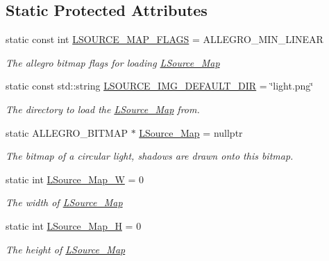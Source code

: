 \subsection*{Static Protected Attributes}
\begin{DoxyCompactItemize}
\item 
static const int \hyperlink{classlighting_1_1LightSource_a596474efbeedef2777aeb01e33d845f5}{L\+S\+O\+U\+R\+C\+E\+\_\+\+M\+A\+P\+\_\+\+F\+L\+A\+GS} = A\+L\+L\+E\+G\+R\+O\+\_\+\+M\+I\+N\+\_\+\+L\+I\+N\+E\+AR
\begin{DoxyCompactList}\small\item\em The allegro bitmap flags for loading \hyperlink{classlighting_1_1LightSource_a11a9e08c80631c3019c2a59947c8458e}{L\+Source\+\_\+\+Map} \end{DoxyCompactList}\item 
static const std\+::string \hyperlink{classlighting_1_1LightSource_a4455fb30412417b0866c5a953cb55314}{L\+S\+O\+U\+R\+C\+E\+\_\+\+I\+M\+G\+\_\+\+D\+E\+F\+A\+U\+L\+T\+\_\+\+D\+IR} = \char`\"{}light.\+png\char`\"{}
\begin{DoxyCompactList}\small\item\em The directory to load the \hyperlink{classlighting_1_1LightSource_a11a9e08c80631c3019c2a59947c8458e}{L\+Source\+\_\+\+Map} from. \end{DoxyCompactList}\item 
static A\+L\+L\+E\+G\+R\+O\+\_\+\+B\+I\+T\+M\+AP $\ast$ \hyperlink{classlighting_1_1LightSource_a11a9e08c80631c3019c2a59947c8458e}{L\+Source\+\_\+\+Map} = nullptr
\begin{DoxyCompactList}\small\item\em The bitmap of a circular light, shadows are drawn onto this bitmap. \end{DoxyCompactList}\item 
static int \hyperlink{classlighting_1_1LightSource_a0f364dedbf71ae79f11d1b05fe2863dd}{L\+Source\+\_\+\+Map\+\_\+W} = 0
\begin{DoxyCompactList}\small\item\em The width of \hyperlink{classlighting_1_1LightSource_a11a9e08c80631c3019c2a59947c8458e}{L\+Source\+\_\+\+Map} \end{DoxyCompactList}\item 
static int \hyperlink{classlighting_1_1LightSource_aff96d0ce927829938fe4ed0b07d95448}{L\+Source\+\_\+\+Map\+\_\+H} = 0
\begin{DoxyCompactList}\small\item\em The height of \hyperlink{classlighting_1_1LightSource_a11a9e08c80631c3019c2a59947c8458e}{L\+Source\+\_\+\+Map} \end{DoxyCompactList}\end{DoxyCompactItemize}
